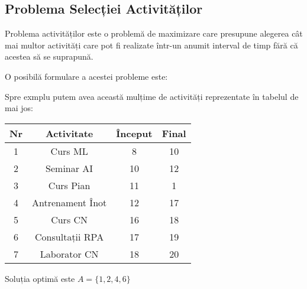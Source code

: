 \subsection{Problema Selecției Activităților}	
Problema activităților este o problemă de maximizare care presupune alegerea cât mai multor activități care pot fi realizate într-un anumit interval de timp fără că acestea să se suprapună.
\vspace{0.5cm}
\par	 
O posibilă formulare a acestei probleme este: \par
{}
\par
\vspace{1cm}
Spre exmplu putem avea această mulțime de activități reprezentate în tabelul de mai jos:
\begin{table}[h!]
	\centering
	\begin{tabular}{||c c c c||} 
		\hline
		Nr & Activitate & Început & Final \\ [1ex] 
		\hline\hline
		1 & Curs ML & 8 & 10\\ \hline
		2 & Seminar AI & 10 & 12 \\\hline
		3 & Curs Pian & 11 & 1 \\\hline
		4 & Antrenament Înot & 12 & 17 \\ \hline
		5 & Curs CN & 16 & 18 \\\hline
		6 & Consultații RPA & 17 & 19 \\ \hline
		7 & Laborator CN & 18 & 20 \\ [1ex] 
		\hline
	\end{tabular}
\end{table}
\par
Soluția optimă este $A = \{1, 2, 4, 6  \} $


